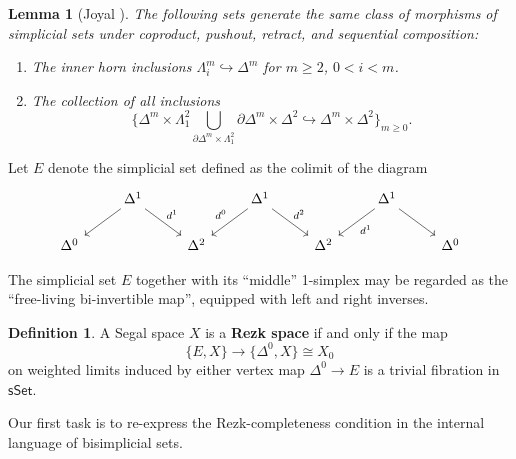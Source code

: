 \documentclass[12pt]{amsart}
\theoremstyle{plain}
\newtheorem{lem}[thm]{Lemma}
\theoremstyle{definition}
\newtheorem{defn}[thm]{Definition}
\theoremstyle{remark}
\numberwithin{equation}{section}
\newcommand{\sSet}{\mathsf{sSet}}
\begin{document}
\begin{lem}[{Joyal \cite[2.3.2.1]{HTT}}]\label{lem:2.3.2.1} The following sets generate the same class of morphisms of simplicial sets under coproduct, pushout, retract, and sequential composition:
\begin{enumerate}
\item The inner horn inclusions $\Lambda^m_i \hookrightarrow\Delta^m$ for $m \geq 2$, $0< i < m$.
\item The collection of all inclusions
\[ \{ \Delta^m \times \Lambda^2_1 \bigcup\limits_{\partial\Delta^m\times \Lambda^2_1} \partial\Delta^m \times\Delta^2 \hookrightarrow \Delta^m \times \Delta^2\}_{m \geq 0}.\]
\end{enumerate}
\end{lem}

Let $E$ denote the simplicial set defined as the colimit of the diagram
\[
\begin{tikzcd} & \Delta^1 \arrow[dl] \arrow[dr, "d^1"] & & \Delta^1 \arrow[dl, "d^0"'] \arrow[dr, "d^2"]  & & \Delta^1 \arrow[dl, "d^1"] \arrow[dr] \\ \Delta^0 & & \Delta^2 & & \Delta^2 & & \Delta^0
\end{tikzcd}
\]

The simplicial set $E$ together with its ``middle'' 1-simplex may be regarded as the ``free-living bi-invertible map'', equipped with left and right inverses.

\begin{defn}\label{defn:rezk-space} A Segal space $X$ is a \textbf{Rezk space} if and only if the map
\[ \{E,X\} \to \{\Delta^0,X\}\cong X_0\] on weighted limits induced by either vertex map $\Delta^0 \to E$ is a trivial fibration in $\sSet$.
\end{defn}

Our first task is to re-express the Rezk-completeness condition in the internal language of bisimplicial sets.
\end{document}
